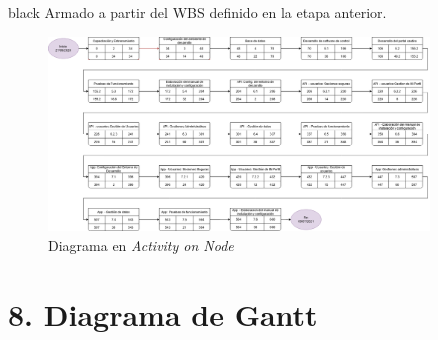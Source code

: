 \documentclass[11pt]{charter}
\begin{document}
\begin{consigna}{black}
Armado a partir del WBS definido en la etapa anterior. 



\begin{figure}[htpb]
\centering 
\includegraphics[width=0.9\textwidth]{./Figuras/AoN.png}
\caption{Diagrama en \textit{Activity on Node}}
\label{fig:AoN}
\end{figure}


\end{consigna}



\newpage
{}
\addtolength{\oddsidemargin}{-.875in}
\vspace*{2px}

\section{8. Diagrama de Gantt}
\label{sec:gantt}
\end{document}
